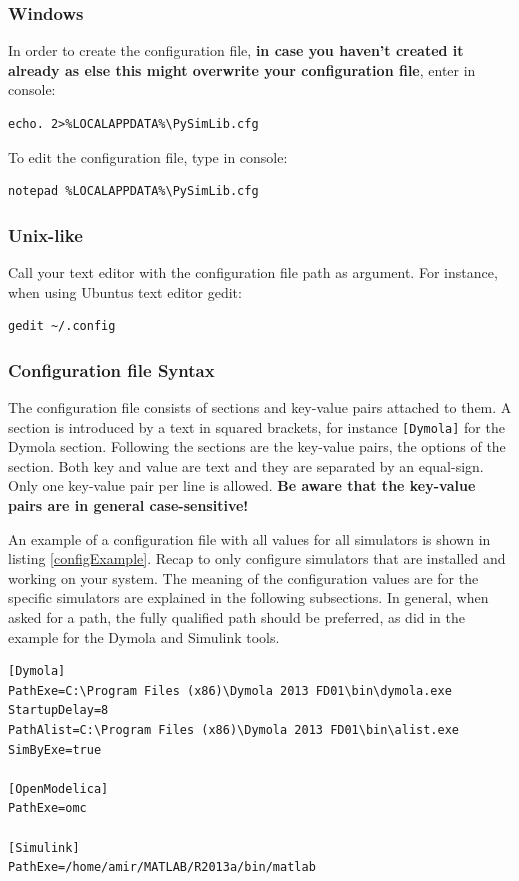 \subsubsection{Windows}
In order to create the configuration file, \textbf{in case you haven't created it already as else this might overwrite your configuration file}, enter in console:
\lstset{language=bash}
\begin{lstlisting}
echo. 2>%LOCALAPPDATA%\PySimLib.cfg
\end{lstlisting}

To edit the configuration file, type in console:
\lstset{language=bash}
\begin{lstlisting}
notepad %LOCALAPPDATA%\PySimLib.cfg
\end{lstlisting}




\subsubsection{Unix-like}
Call your text editor with the configuration file path as argument.
For instance, when using Ubuntus text editor \grqq{}gedit\grqq{}:
\lstset{language=bash}
\begin{lstlisting}
gedit ~/.config
\end{lstlisting}




\subsubsection{Configuration file Syntax}
The configuration file consists of sections and key-value pairs attached to them.
A section is introduced by a text in squared brackets, for instance \texttt{[Dymola]} for the \grqq{}Dymola\grqq{} section.
Following the sections are the key-value pairs, the options of the section.
Both key and value are text and they are separated by an equal-sign.
Only one key-value pair per line is allowed.
\textbf{Be aware that the key-value pairs are in general case-sensitive!}

An example of a configuration file with all values for all simulators is shown in listing \ref{configExample}.
Recap to only configure simulators that are installed and working on your system.
The meaning of the configuration values are for the specific simulators are explained in the following subsections.
In general, when asked for a path, the fully qualified path should be preferred, as did in the example for the Dymola and Simulink tools.
\begin{lstlisting}
[Dymola]
PathExe=C:\Program Files (x86)\Dymola 2013 FD01\bin\dymola.exe
StartupDelay=8
PathAlist=C:\Program Files (x86)\Dymola 2013 FD01\bin\alist.exe
SimByExe=true

[OpenModelica]
PathExe=omc

[Simulink]
PathExe=/home/amir/MATLAB/R2013a/bin/matlab
\end{lstlisting}





